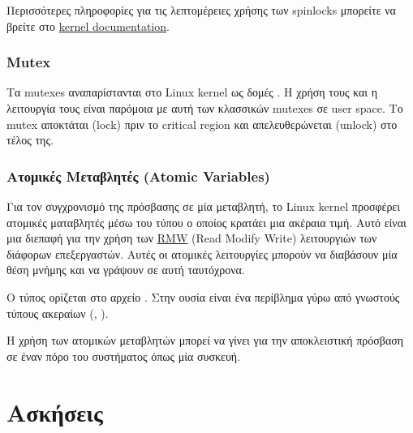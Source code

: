 \documentclass[18pt]{extarticle}
\begin{document}
\begin{file}
        
\end{file}

\begin{info}[]
   Περισσότερες πληροφορίες για τις λεπτομέρειες χρήσης των spinlocks 
    μπορείτε να βρείτε στο \href{https://docs.kernel.org/locking/spinlocks.html}{kernel documentation}.
\end{info}


\subsubsection{Mutex}

Τα mutexes αναπαρίστανται στο Linux kernel ως δομές .
Η χρήση τους και η λειτουργία τους είναι παρόμοια με αυτή των κλασσικών mutexes σε user space.
Το mutex αποκτάται (lock) πριν το critical region και απελευθερώνεται (unlock) στο τέλος της.

\subsubsection{Ατομικές Μεταβλητές (Atomic Variables)}

Για τον συγχρονισμό της πρόσβασης σε μία μεταβλητή, το Linux kernel προσφέρει ατομικές ματαβλητές 
μέσω του τύπου  ο οποίος κρατάει μια ακέραια τιμή. 
Αυτό είναι μια διεπαφή για την χρήση των \href{https://en.wikipedia.org/wiki/Read\%E2\%80\%93modify\%E2\%80\%93write}{RMW} (Read Modify Write) λειτουργιών των διάφορων επεξεργαστών.
Αυτές οι ατομικές λειτουργίες μπορούν να διαβάσουν μία θέση μνήμης και να γράψουν σε αυτή ταυτόχρονα.

\begin{file}
        
\end{file}


\begin{info}[Σημείωση]
    Ο τύπος  ορίζεται στο αρχείο .
    Στην ουσία είναι ένα περίβλημα γύρω από γνωστούς τύπους ακεραίων (, ).
\end{info}

Η χρήση των ατομικών μεταβλητών μπορεί να γίνει για την αποκλειστική πρόσβαση σε έναν πόρο του συστήματος όπως μία συσκευή.

\section{Ασκήσεις}
\end{document}
